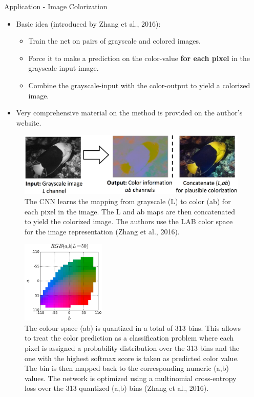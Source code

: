 \begin{vbframe}{Application - Image Colorization}
    \begin{itemize}
        \item Basic idea (introduced by Zhang et al., 2016):
        \begin{itemize}
            \item Train the net on pairs of grayscale and colored images.
            \item Force it to make a prediction on the color-value \textbf{for each pixel} in the grayscale input image.
            \item Combine the grayscale-input with the color-output to yield a colorized image.
        \end{itemize}
        \item Very comprehensive material on the method is provided on the author's website. \href{http://richzhang.github.io/colorization/}{}
            \end{itemize}
            \framebreak
            \begin{figure}
            \centering
            \includegraphics[width=11cm]{figure/fish_lab.png}
            \caption{The CNN learns the mapping from grayscale (L) to color (ab) for each pixel in the image. The L and ab maps are then concatenated to yield the colorized image. The authors use the LAB color space for the image representation (Zhang et al., 2016).}
            \end{figure}
            \framebreak
            \begin{figure}
            \centering
            \includegraphics[width=4cm]{figure/lab.png}
            \caption{\small The colour space (ab) is quantized in a total of 313 bins. This allows to treat the color prediction as a classification problem where each pixel is assigned a probability distribution over the 313 bins and the one with the highest softmax score is taken as predicted color value. The bin is then mapped back to the corresponding numeric (a,b) values. The network is optimized using a multinomial cross-entropy loss over the 313 quantized (a,b) bins (Zhang et al., 2016).}

\end{figure}
\end{vbframe}

